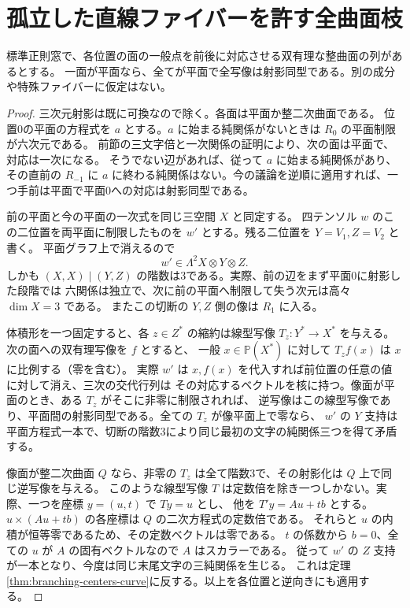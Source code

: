 \section{孤立した直線ファイバーを許す全曲面枝}
\label{sec:isolated-surface-fibers}
\begin{lemma}\label{lem:plane-transition-rigidity}
標準正則窓で、各位置の面の一般点を前後に対応させる双有理な整曲面の列があるとする。
一面が平面なら、全てが平面で全写像は射影同型である。別の成分や特殊ファイバーに仮定はない。
\end{lemma}
\begin{proof}
三次元射影は既に可換なので除く。各面は平面か整二次曲面である。
位置0の平面の方程式を $a$ とする。$a$ に始まる純関係がないときは $R_0$ の平面制限が六次元である。
前節の三文字倍と一次関係の証明により、次の面は平面で、対応は一次になる。
そうでない辺があれば、従って $a$ に始まる純関係があり、その直前の $R_{-1}$ に
$a$ に終わる純関係はない。今の議論を逆順に適用すれば、一つ手前は平面で平面0への対応は射影同型である。

前の平面と今の平面の一次式を同じ三空間 $X$ と同定する。
四テンソル $w$ のこの二位置を両平面に制限したものを $w'$ とする。残る二位置を $Y=V_1,Z=V_2$ と書く。
平面グラフ上で消えるので
\[
 w'\in\Lambda^2 X\otimes Y\otimes Z .
\]
しかも $(X,X)\mid(Y,Z)$ の階数は3である。実際、前の辺をまず平面0に射影した段階では
六関係は独立で、次に前の平面へ制限して失う次元は高々 $\dim X=3$ である。
またこの切断の $Y,Z$ 側の像は $R_1$ に入る。

体積形を一つ固定すると、各 $z\in Z^*$ の縮約は線型写像
$T_z:Y^*\to X^*$ を与える。次の面への双有理写像を $f$ とすると、
一般 $x\in\mathbb P(X^*)$ に対して $T_z f(x)$ は $x$ に比例する（零を含む）。
実際 $w'$ は $x,f(x)$ を代入すれば前位置の任意の値に対して消え、三次の交代行列は
その対応するベクトルを核に持つ。像面が平面のとき、ある $T_z$ がそこに非零に制限されれば、
逆写像はこの線型写像であり、平面間の射影同型である。全ての $T_z$ が像平面上で零なら、
$w'$ の $Y$ 支持は平面方程式一本で、切断の階数3により同じ最初の文字の純関係三つを得て矛盾する。

像面が整二次曲面 $Q$ なら、非零の $T_z$ は全て階数3で、その射影化は $Q$ 上で同じ逆写像を与える。
このような線型写像 $T$ は定数倍を除き一つしかない。実際、一つを座標 $y=(u,t)$ で $T y=u$ とし、
他を $T'y=A u+t b$ とする。$u\times(Au+t b)$ の各座標は $Q$ の二次方程式の定数倍である。
それらと $u$ の内積が恒等零であるため、その定数ベクトルは零である。
$t$ の係数から $b=0$、全ての $u$ が $A$ の固有ベクトルなので $A$ はスカラーである。
従って $w'$ の $Z$ 支持が一本となり、今度は同じ末尾文字の三純関係を生じる。
これは定理\ref{thm:branching-centers-curve}に反する。以上を各位置と逆向きにも適用する。
\end{proof}

